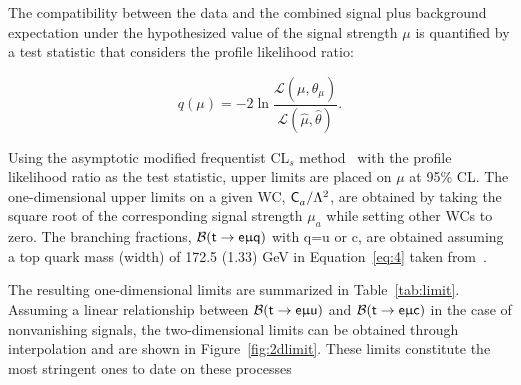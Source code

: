 The compatibility between the data and the combined signal plus background expectation under the hypothesized value of the signal strength $\mu$ is quantified by a test statistic that considers the profile likelihood ratio:

\begin{equation}
q(\mu)=-2\ln\frac{\mathcal{L}(\mu,\hat{\theta}_{\mu})}{\mathcal{L}(\hat{\mu},\hat{\theta})}.
\end{equation}

Using the asymptotic modified frequentist CL$_{s}$ method~\cite{Junk:1999kv,Read2002,Cowan:2010js} with the profile likelihood ratio as the test statistic, upper limits are placed on $\mu$ at 95\% \ac{CL}. The one-dimensional upper limits on a given \ac{WC}, $\textsf{C}^{}_{a}/\mathrm{\Lambda}^2$, are obtained by taking the square root of the corresponding signal strength $\mu_a$ while setting other \acp{WC} to zero. The branching fractions, $\mathcal{B} (\textsf{t}\rightarrow\textsf{e}\upmu\textsf{q})$ with q=u or c, are obtained assuming a top quark mass (width) of 172.5 (1.33) GeV in Equation~\ref{eq:4} taken from~\cite{Kile:2008rp}.

The resulting one-dimensional limits are summarized in Table~\ref{tab:limit}. Assuming a linear relationship between $\mathcal{B}(\textsf{t}\rightarrow\textsf{e}\upmu\textsf{u})$ and $\mathcal{B}(\textsf{t}\rightarrow\textsf{e}\upmu\textsf{c})$ in the case of nonvanishing signals, the two-dimensional limits can be obtained through interpolation and are shown in Figure~\ref{fig:2dlimit}. These limits constitute the most stringent ones to date on these processes

\begin{table}[th]
\sffamily
\centering
\caption{Upper limits at 95\% \ac{CL} on \acp{WC} and the branching fractions. The expected and observed upper limits are shown in regular and bold fonts, respectively. The intervals that contain 68\% of the distribution of the expected upper limits are shown in parentheses.}
\label{tab:limit}
\end{table}

